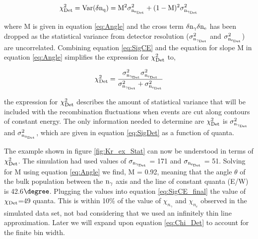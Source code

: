 \begin{equation}
\rm \chi_{Det}^2= Var(\delta n_q) = M^2\sigma_{n_{e_{Det}}}^2 + (1-M)^2\sigma_{n_{\gamma_{Det}}}^2
\label{eq:SigCE}
\end{equation}

\noindent where M is given in equation \ref{eq:Angle} and the cross term $\rm \delta n_\gamma \delta n_e$ has been dropped as the statistical variance from detector resolution ($\rm \sigma_{n_{\gamma_{Det}}}^2$ and $\rm \sigma_{n_{e_{Det}}}^2$) are uncorrelated. Combining equation \ref{eq:SigCE} and the equation for slope M in equation \ref{eq:Angle} simplifies the expression for $\rm \chi_{Det}^2$ to,

\begin{equation}
\rm \chi_{Det}^2 =\frac{\sigma_{n_{\gamma_{Det}}}^2\sigma_{n_{e_{Det}}}^2}{\sigma_{n_{\gamma_{Det}}}^2+ \sigma_{n_{e_{Det}}}^2} \\
\label{eq:SigCE_final}
\end{equation}

\noindent the expression for $\rm \chi_{Det}^2$ describes the amount of statistical variance that will be included with the recombination fluctuations when events are cut along contours of constant energy. The only information needed to determine are $\rm \chi_{Det}^2$ is $\rm \sigma_{n_{\gamma_{Det}}}^2$ and $\rm \sigma_{n_{n_{Det}}}^2$, which are given in equation \ref{eq:SigDet} as a function of quanta. 

\label{sec:Chi_ex_1}
The example shown in figure \ref{fig:Kr_ex_Stat} can now be understood in terms of $\rm \chi_{Det}^2$. The simulation had used values of $\rm \sigma_{n_{\gamma_{Det}}}$ = 171 and $\rm \sigma_{n_{e_{Det}}}$ = 51. Solving for M using equation \ref{eq:Angle} we find, M = 0.92, meaning that the angle $\theta$ of the bulk population between the $\rm n_\gamma$ axis and the line of constant quanta (E/W) is 42.6$\degree$. Plugging the values into equation \ref{eq:SigCE_final}  the value of $\rm \chi_{Det}$=49 quanta. This is within 10\% of the value of $\chi_{n_\gamma}$ and $\chi_{n_e}$ observed in the simulated data set, not bad considering that we used an infinitely thin line approximation. Later we will expand upon equation \ref{eq:Chi_Det} to account for the finite bin width.

 
 
